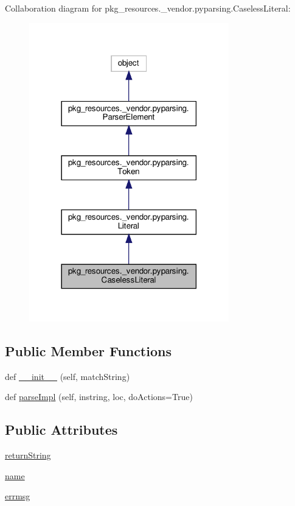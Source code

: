 Collaboration diagram for pkg\+\_\+resources.\+\_\+vendor.\+pyparsing.\+Caseless\+Literal\+:
\nopagebreak
\begin{figure}[H]
\begin{center}
\leavevmode
\includegraphics[width=246pt]{classpkg__resources_1_1__vendor_1_1pyparsing_1_1CaselessLiteral__coll__graph}
\end{center}
\end{figure}
\subsection*{Public Member Functions}
\begin{DoxyCompactItemize}
\item 
def \hyperlink{classpkg__resources_1_1__vendor_1_1pyparsing_1_1CaselessLiteral_a069f18375b91ce9c1e2aa530f02c3bfc}{\+\_\+\+\_\+init\+\_\+\+\_\+} (self, match\+String)
\item 
def \hyperlink{classpkg__resources_1_1__vendor_1_1pyparsing_1_1CaselessLiteral_aed18b36a50ecbdb395c5699bd4a9bb69}{parse\+Impl} (self, instring, loc, do\+Actions=True)
\end{DoxyCompactItemize}
\subsection*{Public Attributes}
\begin{DoxyCompactItemize}
\item 
\hyperlink{classpkg__resources_1_1__vendor_1_1pyparsing_1_1CaselessLiteral_a9248e42c15b35a51bc72e7d57c83395c}{return\+String}
\item 
\hyperlink{classpkg__resources_1_1__vendor_1_1pyparsing_1_1CaselessLiteral_ab6a2d21f56b3ce6ebc866b612b395fec}{name}
\item 
\hyperlink{classpkg__resources_1_1__vendor_1_1pyparsing_1_1CaselessLiteral_a2e0948e33687920a316e8203225d3c40}{errmsg}
\end{DoxyCompactItemize}
